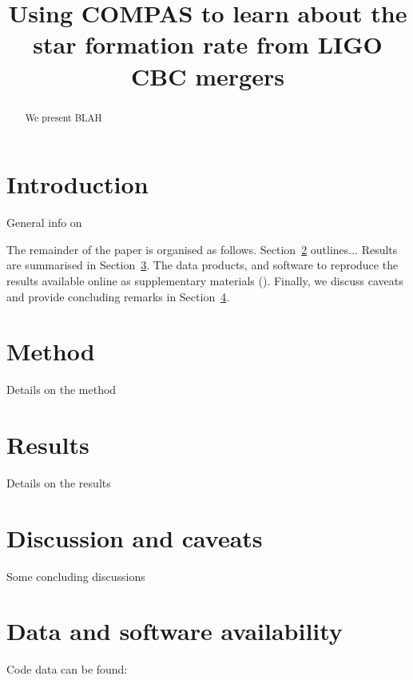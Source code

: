 \documentclass[floatfix,ApJL,twocolumn]{aastex631}
\begin{document}
\title{Using COMPAS to learn about the star formation rate from LIGO CBC mergers}







\begin{abstract}
We present BLAH
\end{abstract}




\section{Introduction} \label{sec:intro}

General  info on

The remainder of the paper is organised as follows.
Section~\ref{sec:method} outlines...
Results are summarised in Section~\ref{sec:results}.
The data products, and software to reproduce the results available online as supplementary materials (\projectUrl).
Finally, we discuss caveats and provide concluding remarks in Section~\ref{sec:conclusion}.

\section{Method} \label{sec:method}
Details on the method

\section{Results}\label{sec:results}
Details on the results

\section{Discussion and caveats}\label{sec:conclusion}
Some concluding discussions

\section{Data and software availability}\label{sec:data}
Code data can be found: \projectGit



\end{document}
